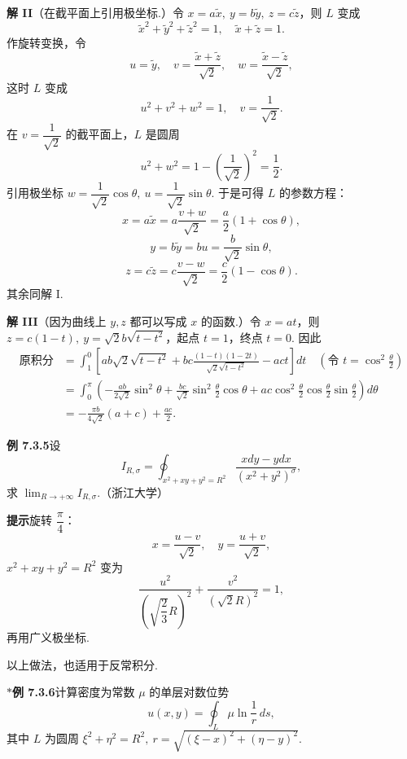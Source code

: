 \documentclass[UTF8, 12pt, fontset=fandol, oneside]{ctexart}
\begin{document}
\noindent\textbf{解 II}\quad （在截平面上引用极坐标.）令 $x=a\tilde x,\ y=b\tilde y,\ z=c\tilde z$，则 $L$ 变成
\[
\tilde x^2+\tilde y^2+\tilde z^2=1,\quad \tilde x+\tilde z=1.
\]
作旋转变换，令
\[
u=\tilde y,\quad v=\frac{\tilde x+\tilde z}{\sqrt2},\quad
w=\frac{\tilde x-\tilde z}{\sqrt2},
\]
这时 $L$ 变成
\[
u^2+v^2+w^2=1,\quad v=\frac1{\sqrt2}.
\]
在 $v=\dfrac1{\sqrt2}$ 的截平面上，$L$ 是圆周
\[
u^2+w^2=1-\left(\frac1{\sqrt2}\right)^2=\frac12.
\]
引用极坐标 $w=\dfrac1{\sqrt2}\cos\theta,\ u=\dfrac1{\sqrt2}\sin\theta$. 于是可得 $L$ 的参数方程：
\[
x=a\tilde x=a\frac{v+w}{\sqrt2}=\frac a2(1+\cos\theta),
\]
\[
y=b\tilde y=bu=\frac b{\sqrt2}\sin\theta,
\]
\[
z=c\tilde z=c\frac{v-w}{\sqrt2}=\frac c2(1-\cos\theta).
\]
其余同解 I.

\noindent\textbf{解 III}\quad （因为曲线上 $y,z$ 都可以写成 $x$ 的函数.）令 $x=at$，则 $z=c(1-t),\ y=\sqrt2b\sqrt{t-t^2}$，起点 $t=1$，终点 $t=0$. 因此
\[
\begin{aligned}
\text{原积分}
&=\int_1^0\left[ab\sqrt2\sqrt{t-t^2}
+bc\frac{(1-t)(1-2t)}{\sqrt2\sqrt{t-t^2}}-act\right]dt
\quad\left(\text{令 }t=\cos^2\frac\theta2\right)\\
&=\int_0^\pi\left(-\frac{ab}{2\sqrt2}\sin^2\theta
+\frac{bc}{\sqrt2}\sin^2\frac\theta2\cos\theta
+ac\cos^2\frac\theta2\cos\frac\theta2\sin\frac\theta2\right)d\theta\\
&=-\frac{\pi b}{4\sqrt2}(a+c)+\frac{ac}{2}.
\end{aligned}
\]

\noindent\textbf{例 7.3.5}\quad 设
\[
I_{R,\sigma}=\oint_{x^2+xy+y^2=R^2}
\frac{xdy-ydx}{(x^2+y^2)^\sigma},
\]
求 $\displaystyle\lim_{R\to+\infty}I_{R,\sigma}$.（浙江大学）

\noindent\textbf{提示}\quad 旋转 $\dfrac\pi4$：
\[
x=\frac{u-v}{\sqrt2},\quad y=\frac{u+v}{\sqrt2},
\]
$x^2+xy+y^2=R^2$ 变为
\[
\frac{u^2}{\left(\sqrt{\dfrac23}R\right)^2}
+\frac{v^2}{(\sqrt2R)^2}=1,
\]
再用广义极坐标.

以上做法，也适用于反常积分.

\noindent\textbf{$*$例 7.3.6}\quad 计算密度为常数 $\mu$ 的单层对数位势
\[
u(x,y)=\oint_L\mu\ln\frac1r\,ds,
\]
其中 $L$ 为圆周 $\xi^2+\eta^2=R^2,\ r=\sqrt{(\xi-x)^2+(\eta-y)^2}$.
\end{document}
